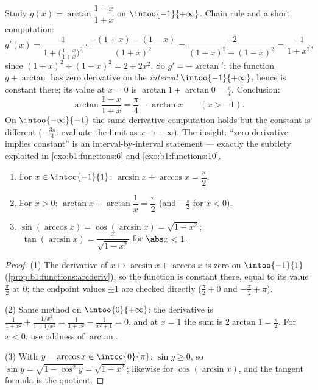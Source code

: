 \begin{example}\label{ex:b1:functions:hiddenconst}
Study $g(x) = \arctan\dfrac{1 - x}{1 + x}$ on $\intoo{-1}
{+\infty}$. Chain rule and a short computation:
\[
g'(x) = \frac{1}{1 + \bigl(\frac{1-x}{1+x}\bigr)^2}\cdot
\frac{-(1+x) - (1-x)}{(1+x)^2}
= \frac{-2}{(1+x)^2 + (1-x)^2}
= \frac{-1}{1 + x^2} ,
\]
since $(1+x)^2 + (1-x)^2 = 2 + 2x^2$. So $g' = -\arctan'$: the
function $g + \arctan$ has zero derivative on the \emph{interval}
$\intoo{-1}{+\infty}$, hence is constant there; its value at $x =
0$ is $\arctan 1 + \arctan 0 = \frac\pi4$. Conclusion:
\[
\arctan\frac{1 - x}{1 + x} = \frac\pi4 - \arctan x
\qquad (x > -1) .
\]
On $\intoo{-\infty}{-1}$ the same derivative computation holds but
the constant is different ($-\frac{3\pi}4$: evaluate the limit as
$x \to -\infty$). The insight: ``zero derivative implies
constant'' is an interval-by-interval statement --- exactly the
subtlety exploited in \cref{exo:b1:functions:6} and
\cref{exo:b1:functions:10}.
\end{example}

\begin{proposition}\label{prop:b1:functions:arcidentities}
\begin{enumerate}
  \item For $x \in \intcc{-1}{1}$: $\arcsin x + \arccos x =
        \dfrac{\pi}{2}$.
  \item For $x > 0$: $\arctan x + \arctan\dfrac 1x = \dfrac{\pi}{2}$
        (and $-\frac\pi2$ for $x < 0$).
  \item $\sin(\arccos x) = \cos(\arcsin x) = \sqrt{1 - x^2}$;
        $\;\tan(\arcsin x) = \dfrac{x}{\sqrt{1 - x^2}}$ for
        $\abs x < 1$.
\end{enumerate}
\end{proposition}

\begin{proof}
(1) The derivative of $x \mapsto \arcsin x + \arccos x$ is zero on
$\intoo{-1}{1}$ (\cref{prop:b1:functions:arcderiv}), so the function
is constant there, equal to its value $\frac\pi2$ at $0$; the endpoint
values $\pm 1$ are checked directly ($\frac\pi2 + 0$ and $-\frac\pi2 +
\pi$).

(2) Same method on $\intoo{0}{+\infty}$: the derivative is
$\frac{1}{1+x^2} + \frac{-1/x^2}{1 + 1/x^2} = \frac{1}{1+x^2} -
\frac{1}{x^2 + 1} = 0$, and at $x = 1$ the sum is $2\arctan 1 =
\frac\pi2$. For $x < 0$, use oddness of $\arctan$.

(3) With $y = \arccos x \in \intcc{0}{\pi}$: $\sin y \geq 0$, so
$\sin y = \sqrt{1 - \cos^2 y} = \sqrt{1 - x^2}$; likewise for
$\cos(\arcsin x)$, and the tangent formula is the quotient.
\end{proof}

